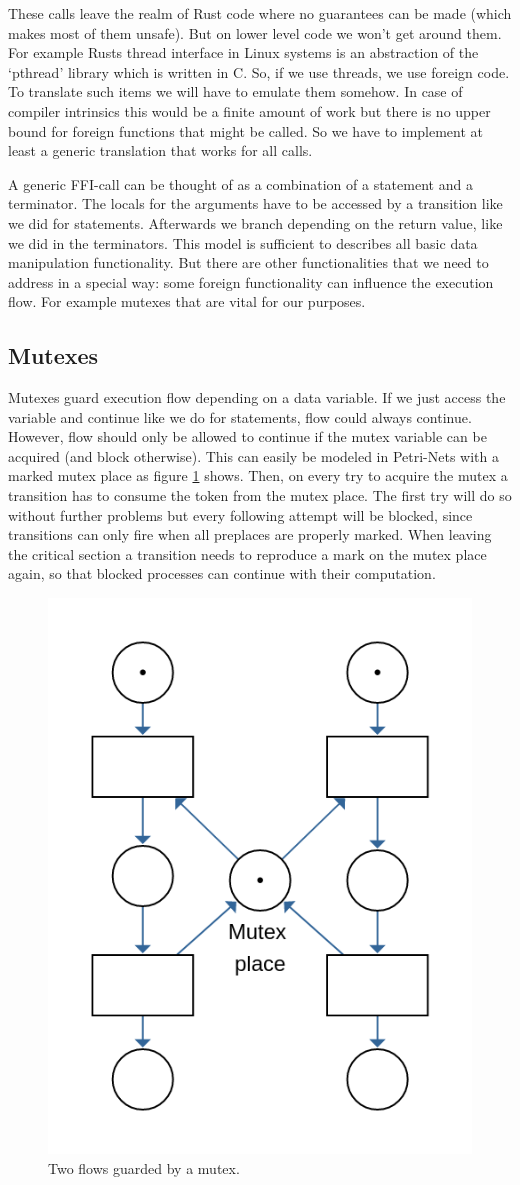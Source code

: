 These calls leave the realm of Rust code where no guarantees can be made (which makes most of them unsafe).
But on lower level code we won't get around them.
For example Rusts thread interface in Linux systems is an abstraction of the `pthread' library which is written in C.
So, if we use threads, we use foreign code.
To translate such items we will have to emulate them somehow.
In case of compiler intrinsics this would be a finite amount of work but there is no upper bound for foreign functions that might be called.
So we have to implement at least a generic translation that works for all calls.

A generic FFI-call can be thought of as a combination of a statement and a terminator.
The locals for the arguments have to be accessed by a transition like we did for statements.
Afterwards we branch depending on the return value, like we did in the terminators.
This model is sufficient to describes all basic data manipulation functionality.
But there are other functionalities that we need to address in a special way:
some foreign functionality can influence the execution flow.
For example mutexes that are vital for our purposes.

\subsection*{Mutexes}
Mutexes guard execution flow depending on a data variable.
If we just access the variable and continue like we do for statements, flow could always continue.
However, flow should only be allowed to continue if the mutex variable can be acquired (and block otherwise).
This can easily be modeled in Petri-Nets with a marked mutex place as figure \ref{mutex_net} shows.
Then, on every try to acquire the mutex a transition has to consume the token from the mutex place.
The first try will do so without further problems but every following attempt will be blocked, since transitions can only fire when all preplaces are properly marked.
When leaving the critical section a transition needs to reproduce a mark on the mutex place again, so that blocked processes can continue with their computation.
\begin{figure}
    \centering
    \includegraphics[width=.4\textwidth]{../diagrams/mutexNet.png}
    \caption{Two flows guarded by a mutex.}
    \label{mutex_net}
\end{figure}

